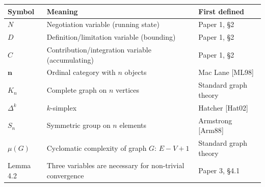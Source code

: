 \documentclass[
  11pt,
  letterpaper,
]{article}
\begin{document}
\begin{longtable}[]{@{}
  >{\raggedright\arraybackslash}p{}
  >{\raggedright\arraybackslash}p{}
  >{\raggedright\arraybackslash}p{}@{}}
\toprule\noalign{}
\begin{minipage}[b]{\linewidth}\raggedright
Symbol
\end{minipage} & \begin{minipage}[b]{\linewidth}\raggedright
Meaning
\end{minipage} & \begin{minipage}[b]{\linewidth}\raggedright
First defined
\end{minipage} \\
\midrule\noalign{}
\endhead
\bottomrule\noalign{}
\endlastfoot
\(N\) & Negotiation variable (running state) & Paper 1, §2 \\
\(D\) & Definition/limitation variable (bounding) & Paper 1, §2 \\
\(C\) & Contribution/integration variable (accumulating) & Paper 1,
§2 \\
\(\mathbf{n}\) & Ordinal category with \(n\) objects & Mac Lane
{[}ML98{]} \\
\(K_n\) & Complete graph on \(n\) vertices & Standard graph theory \\
\(\Delta^k\) & \(k\)-simplex & Hatcher {[}Hat02{]} \\
\(S_n\) & Symmetric group on \(n\) elements & Armstrong {[}Arm88{]} \\
\(\mu(G)\) & Cyclomatic complexity of graph \(G\): \(E - V + 1\) &
Standard graph theory \\
Lemma 4.2 & Three variables are necessary for non-trivial convergence &
Paper 3, §4.1 \\
\end{longtable}
\end{document}
